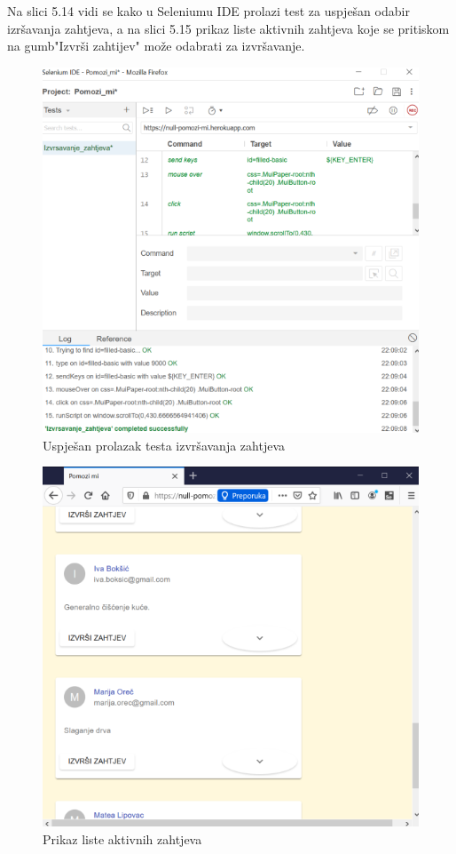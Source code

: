         \noindent \text 
        Na slici 5.14 vidi se kako u Seleniumu IDE prolazi test za uspješan odabir izršavanja zahtjeva, a na slici 5.15 prikaz liste aktivnih zahtjeva koje se pritiskom na gumb"Izvrši zahtijev" može odabrati za izvršavanje. \\
		\begin{figure}[H]
                 \includegraphics[width=\textwidth, height=\textheight, keepaspectratio]{slike/izvrsavanjeZahtjeva.png}
                \centering
                \caption{Uspješan prolazak testa izvršavanja zahtjeva}
        \end{figure}
		\begin{figure}[H]
                 \includegraphics[width=\textwidth, height=\textheight, keepaspectratio]{slike/izvrsiZahtj.png}
                \centering
                \caption{Prikaz liste aktivnih zahtjeva}
        \end{figure}
        
